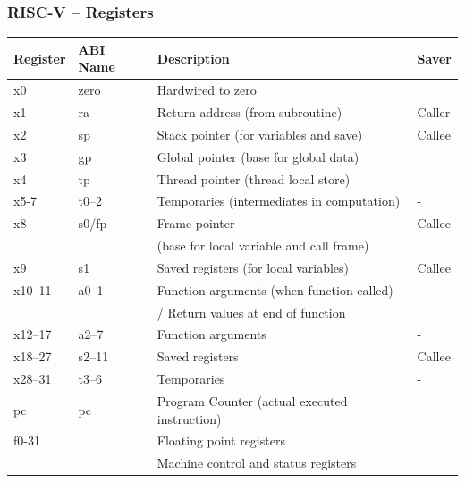 \documentclass[aspectratio=169]{beamer}
\begin{document}
\begin{frame}[shrink=20]
\frametitle{RISC-V -- Registers}
\begin{tabular}{|l|l|l|l|}\hline
Register & ABI Name & Description & Saver \\ \hline
x0 & zero & Hardwired to zero &  \\\hline
x1 & ra & Return address (from subroutine) & Caller \\\hline
x2 & sp & Stack pointer (for variables and save) &  Callee \\\hline
x3 & gp & Global pointer (base for global data) &  \\\hline
x4 & tp & Thread pointer (thread local store) &  \\\hline
x5-7 & t0--2 & Temporaries (intermediates in computation) &  - \\\hline
x8 & s0/fp & Frame pointer  & Callee \\
   &       & (base for local variable and call frame) &  \\\hline
x9 & s1 & Saved registers (for local variables) &  Callee \\\hline
x10--11 & a0--1 & Function arguments (when function called) &  - \\
 &  & / Return values at end of function  & \\\hline
x12--17 & a2--7 & Function arguments & - \\\hline
x18--27 & s2--11 & Saved registers & Callee \\\hline
x28--31 & t3--6 & Temporaries &  - \\\hline
pc & pc & Program Counter (actual executed instruction) &  \\\hline
f0-31 &  & Floating point registers &  \\\hline
     &  & Machine control and status registers & \\\hline
\end{tabular}
\end{frame}
\end{document}
